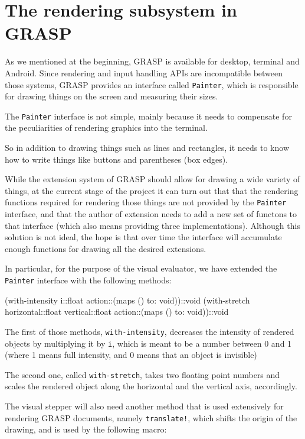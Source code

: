 \documentclass[acmsmall]{acmart}
\newenvironment{Snippet}{\Verbatim[samepage=true]}{\endVerbatim}
\begin{document}
\section{The rendering subsystem in GRASP}

As we mentioned at the beginning, GRASP is available for desktop, terminal
and Android. Since rendering and input handling APIs are incompatible
between those systems, GRASP provides an interface called \texttt{Painter},
which is responsible for drawing things on the screen and measuring their
sizes.

The \texttt{Painter} interface is not simple, mainly because it needs
to compensate for the peculiarities of rendering graphics into the terminal.

So in addition to drawing things such as lines and rectangles, it needs
to know how to write things like buttons and parentheses (box edges).

While the extension system of GRASP should allow for drawing a wide variety
of things, at the current stage of the project it can turn out that
that the rendering functions required for rendering those things are
not provided by the \texttt{Painter} interface, and that the author
of extension needs to add a new set of functons to that interface
(which also means providing three implementations). Although this
solution is not ideal, the hope is that over time the interface will
accumulate enough functions for drawing all the desired extensions.

In particular, for the purpose of the visual evaluator, we have
extended the \texttt{Painter} interface with the following methods:

\begin{Snippet}
(with-intensity i::float action::(maps () to: void))::void
(with-stretch horizontal::float vertical::float action::(maps () to: void))::void
\end{Snippet}

The first of those methods, \texttt{with-intensity}, decreases
the intensity of rendered objects by multiplying it by \texttt{i},
which is meant to be a number between 0 and 1 (where 1 means full
intensity, and 0 means that an object is invisible)

The second one, called \texttt{with-stretch}, takes two floating point
numbers and scales the rendered object along the horizontal and the
vertical axis, accordingly.

The visual stepper will also need another method that is used
extensively for rendering GRASP documents, namely \texttt{translate!},
which shifts the origin of the drawing, and is used by the following macro:
\end{document}
